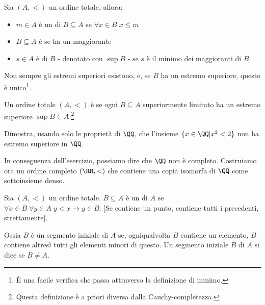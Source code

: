 \documentclass[11pt]{scrartcl}
\begin{document}
\begin{definition}
	Sia $(A,<)$ un ordine totale, allora:
	\begin{itemize}
		\item $m \in A$ è un  di $B \subseteq A$ se $\forall x \in B \; x \leq m$
		\item $B \subseteq A$ è  se ha un maggiorante
		\item $s\in A$ è  di $B$ - denotato con $\sup B$ - se $s$ è il minimo dei maggioranti di $B$.
	\end{itemize}
\end{definition}

\begin{note}
	Non sempre gli estremi superiori esistono, e, se $B$ ha un estremo superiore, questo è unico\footnote{È una facile verifica che passa attraverso la definizione di minimo.}.
\end{note}

\begin{definition}
	Un ordine totale $(A,<)$ è  se ogni $B \subseteq A$ superiormente limitato ha un estremo superiore $\sup B \in A$.\footnote{Questa definizione è a priori diversa dalla Cauchy-completezza.}
\end{definition}

\begin{exercise}
	\label{q_noncompleto}
	Dimostra, usando solo le proprietà di $\QQ$, che l'insieme $\{x \in \QQ | x^2 < 2\}$ non ha estremo superiore in $\QQ$.
\end{exercise}

In conseguenza dell'esercizio, possiamo dire che $\QQ$ non è completo. Costruiamo ora un ordine completo $(\RR,<)$ che contiene una copia isomorfa di $\QQ$ come sottoinsieme denso.

\begin{definition}
	Sia $(A,<)$ un ordine totale. $B \subseteq A$ è un  di $A$ se $\forall x \in B \; \forall y \in A \; y < x \rightarrow y \in B$. [Se contiene un punto, contiene tutti i precedenti, strettamente].
\end{definition}

Ossia $B$ è un segmento iniziale di $A$ se, ogniqualvolta $B$ contiene un elemento, $B$ contiene altresì tutti gli elementi minori di questo.
Un segmento iniziale $B$ di $A$ si dice  se $B \ne A$.
\end{document}
